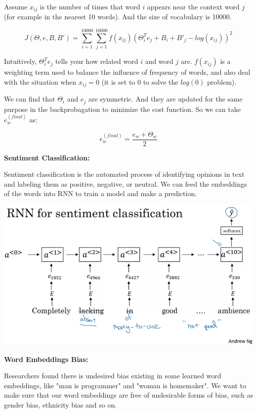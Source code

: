 \documentclass{article}
\begin{document}
\noindent Assume \(x_{ij}\) is the number of times that word \(i\) appears near the context word \(j\) (for example in the nearest 10 words). And the size of vocabulary is 10000.

\[J(\Theta, e, B, B') = \sum_{i = 1}^{10000} \sum_{j = 1}^{10000} f(x_{ij}) (\Theta_{i}^{T} e_{j} + B_{i} + B'_{j} - log(x_{ij}))^{2}\]

\noindent Intuitively, \(\Theta_{i}^{T} e_{j}\) tells your how related word \(i\) and word \(j\) are. \(f(x_{ij})\) is a weighting term used to balance the influence of frequency of words, and also deal with the situation when \(x_{ij} = 0\) (it is set to 0 to solve the \(log(0)\) problem).

\bigskip

\noindent We can find that \(\Theta_{i}\) and \(e_{j}\) are symmetric. And they are updated for the same purpose in the backprobagation to minimize the cost function. So we can take \(e_{w}^{(final)}\) as:

\[e_{w}^{(final)} = \frac{e_{w} + \Theta_{w}}{2}\]

\noindent \textbf{Sentiment Classification:}

\noindent Sentiment classification is the automated process of identifying opinions in text and labeling them as positive, negative, or neutral. We can feed the embeddings of the words into RNN to train a model and make a prediction.

\begin{center}
\includegraphics[scale=0.3]{./images/sentiment_classification.png}
\end{center}

\noindent \textbf{Word Embeddings Bias:}

\noindent Researchers found there is undesired bias existing in some learned word embeddings, like "man is programmer" and "woman is homemaker". We want to make sure that our word embeddings are free of undesirable forms of bias, such as gender bias, ethnicity bias and so on.
\end{document}
